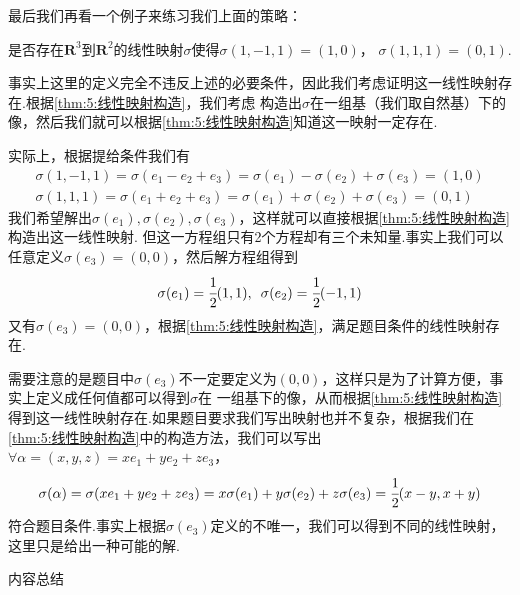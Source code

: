 最后我们再看一个例子来练习我们上面的策略：
\begin{example}\label{ex:5:线性映射判断2}
    是否存在$\mathbf{R}^3$到$\mathbf{R}^2$的线性映射$\sigma$使得$\sigma(1,-1,1)=(1,0)$，
	$\sigma(1,1,1)=(0,1)$.
\end{example}
\begin{solution}
    事实上这里的定义完全不违反上述的必要条件，因此我们考虑证明这一线性映射存在.根据\autoref{thm:5:线性映射构造}，我们考虑
    构造出$\sigma$在一组基（我们取自然基）下的像，然后我们就可以根据\autoref{thm:5:线性映射构造}知道这一映射一定存在.

    实际上，根据提给条件我们有
    \begin{gather*}
        \sigma(1,-1,1)=\sigma(e_1-e_2+e_3)=\sigma(e_1)-\sigma(e_2)+\sigma(e_3)=(1,0) \\
        \sigma(1,1,1)=\sigma(e_1+e_2+e_3)=\sigma(e_1)+\sigma(e_2)+\sigma(e_3)=(0,1)
    \end{gather*}
    我们希望解出$\sigma(e_1),\sigma(e_2),\sigma(e_3)$，这样就可以直接根据\autoref{thm:5:线性映射构造}构造出这一线性映射.
    但这一方程组只有2个方程却有三个未知量.事实上我们可以任意定义$\sigma(e_3)=(0,0)$，然后解方程组得到
    \[\sigma(e_1)=\cfrac{1}{2}(1,1),\enspace \sigma(e_2)=\cfrac{1}{2}(-1,1)\]
    又有$\sigma(e_3)=(0,0)$，根据\autoref{thm:5:线性映射构造}，满足题目条件的线性映射存在.
\end{solution}
需要注意的是题目中$\sigma(e_3)$不一定要定义为$(0,0)$，这样只是为了计算方便，事实上定义成任何值都可以得到$\sigma$在
一组基下的像，从而根据\autoref{thm:5:线性映射构造}得到这一线性映射存在.如果题目要求我们写出映射也并不复杂，根据我们在
\autoref{thm:5:线性映射构造}中的构造方法，我们可以写出$\forall\alpha=(x,y,z)=xe_1+ye_2+ze_3$，
\[\sigma(\alpha)=\sigma(xe_1+ye_2+ze_3)=x\sigma(e_1)+y\sigma(e_2)+z\sigma(e_3)=\cfrac{1}{2}(x-y,x+y)\]
符合题目条件.事实上根据$\sigma(e_3)$定义的不唯一，我们可以得到不同的线性映射，这里只是给出一种可能的解.

\vspace{2ex}
\centerline{\heiti \Large 内容总结}

\vspace{2ex}

